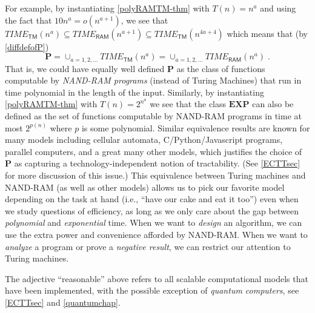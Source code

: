For example, by instantiating \cref{polyRAMTM-thm} with \(T(n)=n^a\) and
using the fact that \(10n^a = o(n^{a+1})\), we see that
\(\ensuremath{\mathit{TIME}}_{\mathsf{TM}}(n^a) \subseteq \ensuremath{\mathit{TIME}}_{\mathsf{RAM}}(n^{a+1}) \subseteq \ensuremath{\mathit{TIME}}_{\mathsf{TM}}(n^{4a+4})\)
which means that (by \cref{diffdefofP}) \[
\mathbf{P} = \cup_{a = 1,2,\ldots} \ensuremath{\mathit{TIME}}_{\mathsf{TM}}(n^a) = \cup_{a = 1,2,\ldots} \ensuremath{\mathit{TIME}}_{\mathsf{RAM}}(n^a) \;.
\] That is, we could have equally well defined \(\mathbf{P}\) as the
class of functions computable by \emph{NAND-RAM programs} (instead of
Turing Machines) that run in time polynomial in the length of the input.
Similarly, by instantiating \cref{polyRAMTM-thm} with \(T(n)=2^{n^a}\)
we see that the class \(\mathbf{EXP}\) can also be defined as the set of
functions computable by NAND-RAM programs in time at most \(2^{p(n)}\)
where \(p\) is some polynomial. Similar equivalence results are known
for many models including cellular automata, C/Python/Javascript
programs, parallel computers, and a great many other models, which
justifies the choice of \(\mathbf{P}\) as capturing a
technology-independent notion of tractability. (See \cref{ECTTsec} for
more discussion of this issue.) This equivalence between Turing machines
and NAND-RAM (as well as other models) allows us to pick our favorite
model depending on the task at hand (i.e., ``have our cake and eat it
too'') even when we study questions of efficiency, as long as we only
care about the gap between \emph{polynomial} and \emph{exponential}
time. When we want to \emph{design} an algorithm, we can use the extra
power and convenience afforded by NAND-RAM. When we want to
\emph{analyze} a program or prove a \emph{negative result}, we can
restrict our attention to Turing machines.

\hypertarget{polyvsnot}{}

The adjective ``reasonable'' above refers to all scalable computational
models that have been implemented, with the possible exception of
\emph{quantum computers}, see \cref{ECTTsec} and \cref{quantumchap}.

